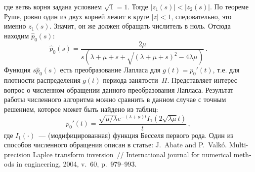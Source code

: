 \documentclass[10pt,oneside,final]{book}
\begin{document}
где ветвь корня задана условием $\sqrt{1}=1$. Тогде $|z_1(s)|<|z_2(s)|$. По
теореме Руше, ровно один из двух корней лежит в круге $|z|<1$, следовательно,
это именно $z_1(s)$. Значит, он же должен обращать числитель в ноль. Отсюда
находим $\hat p_0(s)$:
\[
\hat
p_0(s)=\dfrac{2\mu}{s(\lambda+\mu+s+\sqrt{(\lambda+\mu+s)^2-4\lambda\mu})}\,. 
\]
Функция $s \hat p_0(s)$ есть преобразование Лапласа для $g(t)=p_0'(t)$, т.е. для
плотности распределения $g(t)$ периода занятости~$\Pi$. Представляет интерес
вопрос о численном обращении данного преобразования Лапласа. Результат работы
численного алгоритма можно сравнить в данном случае с точным решением, которое
может быть найдено из таблиц:
\[
p_0'(t)=\dfrac{\sqrt{\mu/\lambda} e^{-(\lambda+\mu)t}
  I_1(2\sqrt{\lambda\mu}t)}{t}\,,
\]
где $I_1(\cdot)$~--- (модифицированная) функция Бесселя первого рода. Один из
способов численного обращения описан в статье: \foreignlanguage{english}{J.~Abate and
P.~Valk\'o. Multi-precision Laplce transform inversion~// International journal
for numerical methods in engineering, 2004, v.~60, p.~979--993.}
\end{document}
